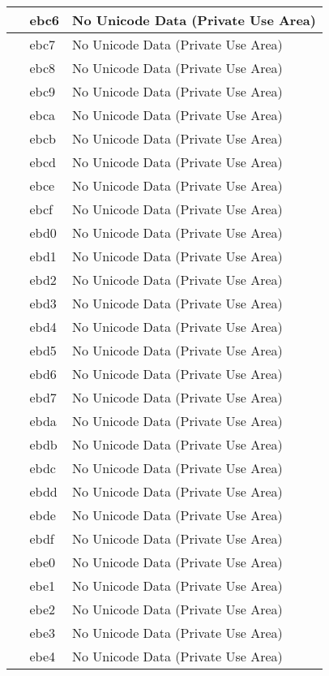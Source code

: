 \documentclass[12pt,letterpaper,openany]{book}
\begin{document}
\begin{center}
\begin{supertabular}{|m{0.25in}|m{0.5in}|m{4in}|}
 & ebc6 & No Unicode Data (Private Use Area)\\\hline
 & ebc7 & No Unicode Data (Private Use Area)\\\hline
 & ebc8 & No Unicode Data (Private Use Area)\\\hline
 & ebc9 & No Unicode Data (Private Use Area)\\\hline
 & ebca & No Unicode Data (Private Use Area)\\\hline
 & ebcb & No Unicode Data (Private Use Area)\\\hline
 & ebcd & No Unicode Data (Private Use Area)\\\hline
 & ebce & No Unicode Data (Private Use Area)\\\hline
 & ebcf & No Unicode Data (Private Use Area)\\\hline
 & ebd0 & No Unicode Data (Private Use Area)\\\hline
 & ebd1 & No Unicode Data (Private Use Area)\\\hline
 & ebd2 & No Unicode Data (Private Use Area)\\\hline
 & ebd3 & No Unicode Data (Private Use Area)\\\hline
 & ebd4 & No Unicode Data (Private Use Area)\\\hline
 & ebd5 & No Unicode Data (Private Use Area)\\\hline
 & ebd6 & No Unicode Data (Private Use Area)\\\hline
 & ebd7 & No Unicode Data (Private Use Area)\\\hline
 & ebda & No Unicode Data (Private Use Area)\\\hline
 & ebdb & No Unicode Data (Private Use Area)\\\hline
 & ebdc & No Unicode Data (Private Use Area)\\\hline
 & ebdd & No Unicode Data (Private Use Area)\\\hline
 & ebde & No Unicode Data (Private Use Area)\\\hline
 & ebdf & No Unicode Data (Private Use Area)\\\hline
 & ebe0 & No Unicode Data (Private Use Area)\\\hline
 & ebe1 & No Unicode Data (Private Use Area)\\\hline
 & ebe2 & No Unicode Data (Private Use Area)\\\hline
 & ebe3 & No Unicode Data (Private Use Area)\\\hline
 & ebe4 & No Unicode Data (Private Use Area)\\\hline

\end{supertabular}
\end{center}
\end{document}
